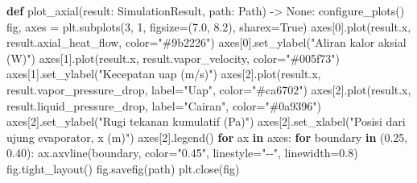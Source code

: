 \documentclass[
  12pt,
  12pt,a4paper,oneside]{report}
\newenvironment{Shaded}{}{}
\newcommand{\ControlFlowTok}[1]{\textcolor[rgb]{0.00,0.44,0.13}{\textbf{#1}}}
\newcommand{\DecValTok}[1]{\textcolor[rgb]{0.25,0.63,0.44}{#1}}
\newcommand{\FloatTok}[1]{\textcolor[rgb]{0.25,0.63,0.44}{#1}}
\newcommand{\KeywordTok}[1]{\textcolor[rgb]{0.00,0.44,0.13}{\textbf{#1}}}
\newcommand{\NormalTok}[1]{#1}
\newcommand{\OperatorTok}[1]{\textcolor[rgb]{0.40,0.40,0.40}{#1}}
\newcommand{\StringTok}[1]{\textcolor[rgb]{0.25,0.44,0.63}{#1}}
\newcommand{\VariableTok}[1]{\textcolor[rgb]{0.10,0.09,0.49}{#1}}
\begin{document}
\begin{Shaded}
\begin{Highlighting}[]
\KeywordTok{def}\NormalTok{ plot\_axial(result: SimulationResult, path: Path) }\OperatorTok{{-}\textgreater{}} \VariableTok{None}\NormalTok{:}
\NormalTok{    configure\_plots()}
\NormalTok{    fig, axes }\OperatorTok{=}\NormalTok{ plt.subplots(}\DecValTok{3}\NormalTok{, }\DecValTok{1}\NormalTok{, figsize}\OperatorTok{=}\NormalTok{(}\FloatTok{7.0}\NormalTok{, }\FloatTok{8.2}\NormalTok{), sharex}\OperatorTok{=}\VariableTok{True}\NormalTok{)}
\NormalTok{    axes[}\DecValTok{0}\NormalTok{].plot(result.x, result.axial\_heat\_flow, color}\OperatorTok{=}\StringTok{"\#9b2226"}\NormalTok{)}
\NormalTok{    axes[}\DecValTok{0}\NormalTok{].set\_ylabel(}\StringTok{"Aliran kalor aksial (W)"}\NormalTok{)}
\NormalTok{    axes[}\DecValTok{1}\NormalTok{].plot(result.x, result.vapor\_velocity, color}\OperatorTok{=}\StringTok{"\#005f73"}\NormalTok{)}
\NormalTok{    axes[}\DecValTok{1}\NormalTok{].set\_ylabel(}\StringTok{"Kecepatan uap (m/s)"}\NormalTok{)}
\NormalTok{    axes[}\DecValTok{2}\NormalTok{].plot(result.x, result.vapor\_pressure\_drop, label}\OperatorTok{=}\StringTok{"Uap"}\NormalTok{, color}\OperatorTok{=}\StringTok{"\#ca6702"}\NormalTok{)}
\NormalTok{    axes[}\DecValTok{2}\NormalTok{].plot(result.x, result.liquid\_pressure\_drop, label}\OperatorTok{=}\StringTok{"Cairan"}\NormalTok{, color}\OperatorTok{=}\StringTok{"\#0a9396"}\NormalTok{)}
\NormalTok{    axes[}\DecValTok{2}\NormalTok{].set\_ylabel(}\StringTok{"Rugi tekanan kumulatif (Pa)"}\NormalTok{)}
\NormalTok{    axes[}\DecValTok{2}\NormalTok{].set\_xlabel(}\StringTok{"Posisi dari ujung evaporator, x (m)"}\NormalTok{)}
\NormalTok{    axes[}\DecValTok{2}\NormalTok{].legend()}
    \ControlFlowTok{for}\NormalTok{ ax }\KeywordTok{in}\NormalTok{ axes:}
        \ControlFlowTok{for}\NormalTok{ boundary }\KeywordTok{in}\NormalTok{ (}\FloatTok{0.25}\NormalTok{, }\FloatTok{0.40}\NormalTok{):}
\NormalTok{            ax.axvline(boundary, color}\OperatorTok{=}\StringTok{"0.45"}\NormalTok{, linestyle}\OperatorTok{=}\StringTok{"{-}{-}"}\NormalTok{, linewidth}\OperatorTok{=}\FloatTok{0.8}\NormalTok{)}
\NormalTok{    fig.tight\_layout()}
\NormalTok{    fig.savefig(path)}
\NormalTok{    plt.close(fig)}



\end{Highlighting}
\end{Shaded}
\end{document}

